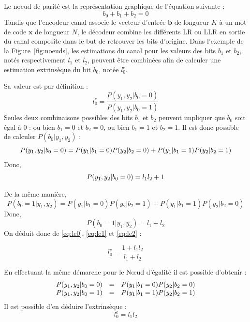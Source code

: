 Le noeud de parité est la représentation graphique de l'équation suivante : 
\begin{equation}
b_0 + b_1 + b_2 = 0
\end{equation}
Tandis que l'encodeur canal associe le vecteur d'entrée $\mathbold{b}$ de longueur $K$ à un mot de code $\mathbold{x}$ de longueur $N$, le décodeur combine les différents LR ou LLR en sortie du canal composite dans le but de retrouver les bits d'origine.
Dans l'exemple de la Figure~\ref{fig:noeuds}, les estimations du canal pour les valeurs des bits $b_1$ et $b_2$, notés respectivement $l_1$ et $l_2$, peuvent être combinées afin de calculer une estimation extrinsèque du bit $b_0$, notée $l_0^e$.

Sa valeur est par définition :
\begin{equation}
l^e_0 = \dfrac{P(y_1,y_2 | b_0 = 0)}{P(y_1,y_2 | b_0 = 1)}
\label{eq:le0}
\end{equation}
Seules deux combinaisons possibles des bits $b_1$ et $b_2$ peuvent impliquer que $b_0$ soit égal à $0$ : ou bien $b_1=0$ et $b_2=0$, ou bien $b_1=1$ et $b_2=1$. Il est donc possible de calculer $P(b_0|y_1,y_2)$ : 
\begin{equation}
P(y_1,y_2 | b_0 = 0)  =  P(y_1 | b_1 = 0)P(y_2 | b_2 = 0) + P(y_1 | b_1 = 1)P(y_2 | b_2 = 1) \\
\end{equation}
Donc,  
\begin{equation}
P(y_1,y_2 | b_0 = 0)  =  l_1l_2 + 1 \\
\label{eq:le1}
\end{equation}


De la même manière,
\begin{equation}
P(b_0 = 1 | y_1,y_2) =P(y_1 | b_1 = 0)P(y_2 | b_2 = 1) + P(y_1 | b_1 = 1)P(y_2 | b_2 = 0)
\end{equation}
Donc, 
\begin{equation}
P(b_0 = 1 | y_1,y_2) = l_1 + l_2
\label{eq:le2}
\end{equation}
On déduit donc de \ref{eq:le0}, \ref{eq:le1} et \ref{eq:le2} : 

\begin{equation}
l^e_0=\dfrac{1 + l_1l_2}{l_1+l_2}
\label{eq:parity}
\end{equation}

En effectuant la même démarche pour le N\oe{}ud d'égalité il est possible d'obtenir :
\begin{eqnarray*}
\begin{array}{r c l}
P(y_1,y_2|b_0=0) & = & P(y_1|b_1=0) P(y_2 | b_2 = 0) \\
P(y_1,y_2|b_0=1) & = & P(y_1|b_1=1) P(y_2 | b_2 = 1) 
\end{array}
\end{eqnarray*}
Il est possible d'en déduire l'extrinsèque :
\begin{equation}
l^e_0=l_1l_2
\label{eq:equality}
\end{equation}

